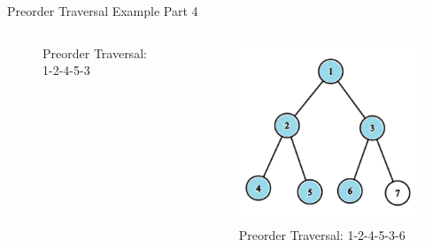 \documentclass[aspectratio=169]{beamer}%
\begin{document}
\begin{frame}{Preorder Traversal Example Part 4}
\begin{columns}
\begin{column}{0.32\textwidth}
\begin{figure}
                \caption{Preorder Traversal: 1-2-4-5-3}
            \end{figure}
        \end{column}
        \hfill
        \begin{column}{0.32\textwidth}
            \begin{figure}
                \centering
                \includegraphics[width = .9\linewidth]{tree-pre 12.png}
                \caption{Preorder Traversal: 1-2-4-5-3-6}
            \end{figure}
        \end{column}
    \end{columns}
\end{frame}
\end{document}
